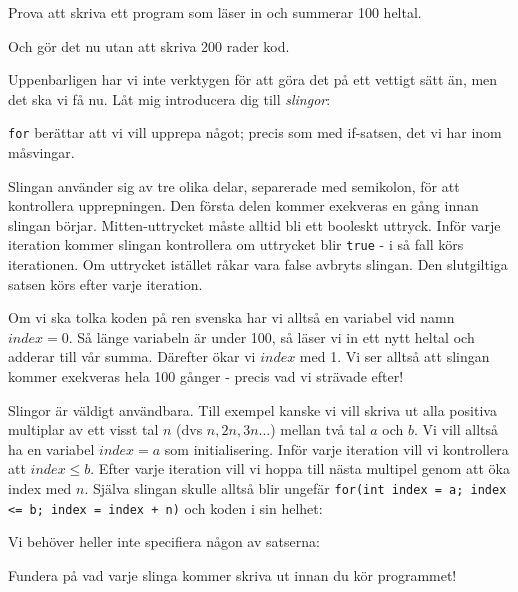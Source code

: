 Prova att skriva ett program som läser in och summerar 100 heltal.

Och gör det nu utan att skriva 200 rader kod.

Uppenbarligen har vi inte verktygen för att göra det på ett vettigt sätt än, men det ska vi få nu. Låt mig introducera dig till \emph{slingor}:



\texttt{for} berättar att vi vill upprepa något; precis som med if-satsen, det vi har inom måsvingar. 

Slingan använder sig av tre olika delar, separerade med semikolon, för att kontrollera upprepningen. Den första delen kommer exekveras en gång innan slingan börjar. Mitten-uttrycket måste alltid bli ett booleskt uttryck. Inför varje iteration kommer slingan kontrollera om uttrycket blir \texttt{true} - i så fall körs iterationen. Om uttrycket istället råkar vara false avbryts slingan. Den slutgiltiga satsen körs efter varje iteration.

Om vi ska tolka koden på ren svenska har vi alltså en variabel vid namn $index = 0$. Så länge variabeln är under 100, så läser vi in ett nytt heltal och adderar till vår summa. Därefter ökar vi $index$ med 1. Vi ser alltså att slingan kommer exekveras hela 100 gånger - precis vad vi strävade efter!

Slingor är väldigt användbara. Till exempel kanske vi vill skriva ut alla positiva multiplar av ett visst tal $n$ (dvs $n, 2n, 3n...$) mellan två tal $a$ och $b$. Vi vill alltså ha en variabel $index = a$ som initialisering. Inför varje iteration vill vi kontrollera att $index \le b$. Efter varje iteration vill vi hoppa till nästa multipel genom att öka index med $n$. Själva slingan skulle alltså blir ungefär \texttt{for(int index = a; index <= b; index = index + n)} och koden i sin helhet:



Vi behöver heller inte specifiera någon av satserna:



Fundera på vad varje slinga kommer skriva ut innan du kör programmet!
